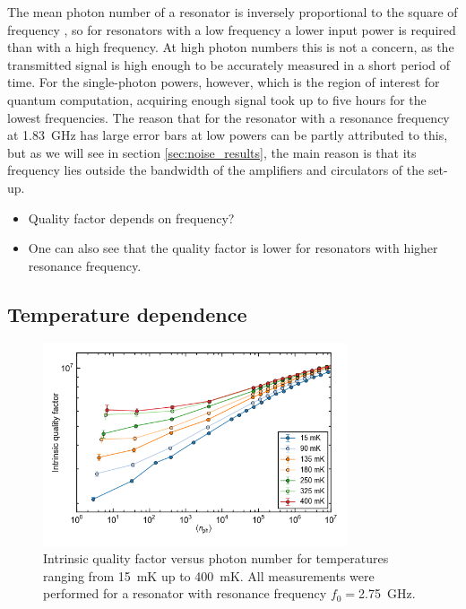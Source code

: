 \documentclass[12pt]{report}
\begin{document}
The mean photon number of a resonator is inversely proportional to the square of frequency \cite{DRIE}, so for resonators with a low frequency a lower input power is required than with a high frequency. At high photon numbers this is not a concern, as the transmitted signal is high enough to be accurately measured in a short period of time. For the single-photon powers, however, which is the region of interest for quantum computation, acquiring enough signal took up to five hours for the lowest frequencies. The reason that for the resonator with a resonance frequency at \SI{1.83}{\giga \hertz} has large error bars at low powers can be partly attributed to this, but as we will see in section \ref{sec:noise_results}, the main reason is that its frequency lies outside the bandwidth of the amplifiers and circulators of the set-up.

\begin{itemize}
    \item Quality factor depends on frequency?
    \item One can also see that the quality factor is lower for resonators with higher resonance frequency.
\end{itemize}




\subsection{Temperature dependence}
\label{sec:resonator:results:emperature_dependence}
\begin{figure}
    \centering
    \includegraphics[width=0.8\textwidth]{Figures/Qi_vs_n_photon_temperature_dependence.png}
    \caption{Intrinsic quality factor versus photon number for temperatures ranging from \SI{15}{\milli \kelvin} up to \SI{400}{\milli \kelvin}. All measurements were performed for a resonator with resonance frequency $f_0 = $\SI{2.75}{\giga \hertz}.}
    \label{fig:Qi_vs_n_photon_temperature_dependence}
\end{figure}
\end{document}
